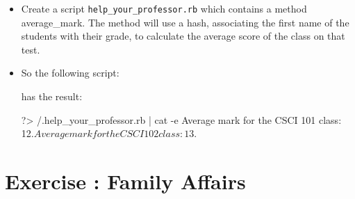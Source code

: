 \documentclass{42-en}
\begin{document}
\makeheaderfiles

\begin{itemize}

\item Create a script \texttt{help\_your\_professor.rb} which contains a method average\_mark. The method will use a hash, associating the first name of the students with their grade, to calculate the average score of the class on that test.

\item So the following script:

has the result:
\begin{42console}
	?> /.help_your_professor.rb | cat -e
	Average mark for the CSCI 101 class: 12.$
	Average mark for the CSCI 102 class: 13.$
\end{42console}
\end{itemize}



\chapter{Exercise \exercicenumber: Family Affairs}

\exnumber{\exercicenumber}

\makeheaderfiles
\end{document}
